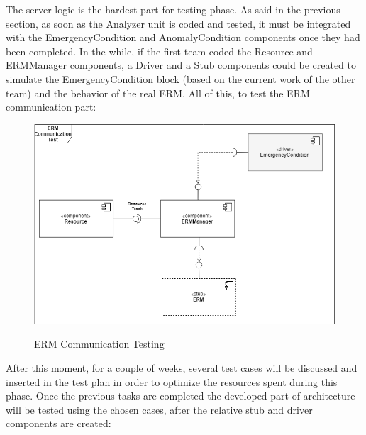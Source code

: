 {{}
The server logic is the hardest part for testing phase. As said in the previous section, as soon as the Analyzer unit is coded and tested, it must be integrated with the EmergencyCondition and AnomalyCondition components once they had been completed. In the while, if the first team coded the Resource and ERMManager components, a Driver and a Stub components could be created to simulate the EmergencyCondition block (based on the current work of the other team) and the behavior of the real ERM. All of this, to test the ERM communication part:
\begin{figure}[H]
	\centering
	\includegraphics[scale=0.4]{Images/uml/erm_testing.png}
	\label{figure19}
	\caption{ERM Communication Testing}
\end{figure}

After this moment, for a couple of weeks, several test cases will be discussed and inserted in the test plan in order to optimize the resources spent during this phase. Once the previous tasks are completed the developed part of architecture will be tested using the chosen cases, after the relative stub and driver components are created:

}
